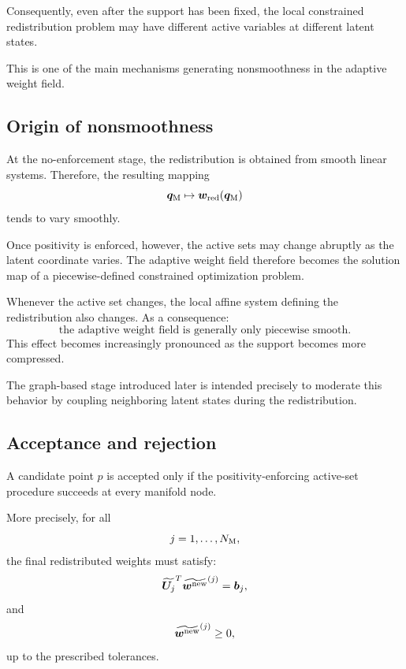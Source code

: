 \documentclass[11pt,a4paper]{article}
\begin{document}
Consequently, even after the support has been fixed, the local constrained
redistribution problem may have different active variables at different latent
states.

This is one of the main mechanisms generating nonsmoothness in the adaptive
weight field.

\subsection{Origin of nonsmoothness}

At the no-enforcement stage, the redistribution is obtained from smooth linear
systems. Therefore, the resulting mapping
\[
        \bm q_{\mathrm{M}}\mapsto\bm w_{\mathrm{red}}(\bm q_{\mathrm{M}})
\]
tends to vary smoothly.

Once positivity is enforced, however, the active sets may change abruptly as the
latent coordinate varies. The adaptive weight field therefore becomes the
solution map of a piecewise-defined constrained optimization problem.

Whenever the active set changes, the local affine system defining the
redistribution also changes. As a consequence:
\[
        \text{the adaptive weight field is generally only piecewise smooth}.
\]
This effect becomes increasingly pronounced as the support becomes more
compressed.

The graph-based stage introduced later is intended precisely to moderate this
behavior by coupling neighboring latent states during the redistribution.

\subsection{Acceptance and rejection}

A candidate point $p$ is accepted only if the positivity-enforcing active-set
procedure succeeds at every manifold node.

More precisely, for all
\[
        j=1,\ldots,N_{\mathrm{M}},
\]
the final redistributed weights must satisfy:
\[
        {\widetilde{\bm U_j}}^T
        \widetilde{\bm w^{\mathrm{new}}}^{(j)}
        =
        \bm b_j,
\]
and
\[
        \widetilde{\bm w^{\mathrm{new}}}^{(j)}\geq 0,
\]
up to the prescribed tolerances.
\end{document}
